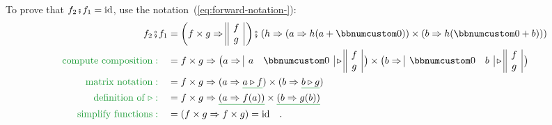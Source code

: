 To prove that $f_{2}\bef f_{1}=\text{id}$, use the notation~(\ref{eq:forward-notation-}):
\begin{align*}
f_{2}\bef f_{1} & =\bigg(f\times g\Rightarrow\begin{array}{||c|}
f\\
g
\end{array}\,\bigg)\bef\left(h\Rightarrow(a\Rightarrow h(a+\bbnum 0))\times(b\Rightarrow h(\bbnum 0+b))\right)\\
{\color{greenunder}\text{compute composition}:}\quad & =f\times g\Rightarrow\big(a\Rightarrow\begin{array}{|cc|}
a & \bbnum 0\end{array}\triangleright\begin{array}{||c|}
f\\
g
\end{array}\,\big)\times\big(b\Rightarrow\begin{array}{|cc|}
\bbnum 0 & b\end{array}\triangleright\begin{array}{||c|}
f\\
g
\end{array}\,\big)\\
{\color{greenunder}\text{matrix notation}:}\quad & =f\times g\Rightarrow(a\Rightarrow\gunderline{a\triangleright f})\times(b\Rightarrow\gunderline{b\triangleright g})\\
{\color{greenunder}\text{definition of }\triangleright:}\quad & =f\times g\Rightarrow\gunderline{\left(a\Rightarrow f(a)\right)}\times\gunderline{\left(b\Rightarrow g(b)\right)}\\
{\color{greenunder}\text{simplify functions}:}\quad & =\left(f\times g\Rightarrow f\times g\right)=\text{id}\quad.
\end{align*}

